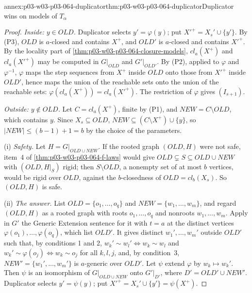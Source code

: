 \begin{annexitem}{annex:p03-w03-p03-064-duplicator}{thm:p03-w03-p03-064-duplicator}{Duplicator wins on models of \(T_\alpha\)}
\begin{proof}
\emph{Inside: \(y\in\mathit{OLD}\).}  Duplicator selects
\(y'=\varphi(y)\); put \(X'^+=X_s'\cup\{y'\}\).  By (P3), \(\mathit{OLD}\) is
\(a\)-closed and contains \(X^+\), and \(\mathit{OLD}'\) is \(a\)-closed and
contains \(X'^+\).  By the locality part of
\cref{thm:p03-w03-p03-064-closure-models}, \(cl_a(X^+)\) and
\(cl_a(X'^+)\) may be computed in \(G|_{\mathit{OLD}}\) and
\(G'|_{\mathit{OLD}'}\).  By (P2), applied to \(\varphi\) and
\(\varphi^{-1}\), \(\varphi\) maps the step sequences from \(X^+\) inside
\(\mathit{OLD}\) onto those from \(X'^+\) inside \(\mathit{OLD}'\), hence
maps the union of the reachable sets onto the union of the reachable sets:
\(\varphi(cl_a(X^+))=cl_a(X'^+)\).  The restriction of \(\varphi\) gives
\((I_{s+1})\).

\emph{Outside: \(y\notin\mathit{OLD}\).}  Let \(C=cl_a(X^+)\), finite by
(P1), and \(\mathit{NEW}=C\setminus\mathit{OLD}\), which contains \(y\).
Since \(X_s\subseteq\mathit{OLD}\),
\(\mathit{NEW}\subseteq(C\setminus X^+)\cup\{y\}\), so
\(|\mathit{NEW}|\leq(b-1)+1=b\) by the choice of the parameters.

(i) \emph{Safety.}  Let \(H=G|_{\mathit{OLD}\cup\mathit{NEW}}\).  If the
rooted graph \((\mathit{OLD},H)\) were not safe, item~4 of
\cref{thm:p03-w03-p03-064-f-laws} would give
\(\mathit{OLD}\subsetneq S\subseteq\mathit{OLD}\cup\mathit{NEW}\) with
\((\mathit{OLD},H|_S)\) rigid; then \(S\setminus\mathit{OLD}\), a nonempty set
of at most \(b\) vertices, would be rigid over \(\mathit{OLD}\), against the
\(b\)-closedness of \(\mathit{OLD}=cl_b(X_s)\).  So \((\mathit{OLD},H)\) is
safe.

(ii) \emph{The answer.}  List \(\mathit{OLD}=\{o_1,\ldots,o_q\}\) and
\(\mathit{NEW}=\{w_1,\ldots,w_m\}\), and regard \((\mathit{OLD},H)\) as a
rooted graph with roots \(o_1,\ldots,o_q\) and nonroots \(w_1,\ldots,w_m\).
Apply in \(G'\) the Generic Extension sentence for it with \(t=a\) at the
distinct vertices \(\varphi(o_1),\ldots,\varphi(o_q)\), which list
\(\mathit{OLD}'\).  It gives distinct \(w_1',\ldots,w_m'\) outside
\(\mathit{OLD}'\) such that, by conditions 1 and 2, \(w_k'\sim w_l'\iff
w_k\sim w_l\) and \(w_k'\sim\varphi(o_j)\iff w_k\sim o_j\) for all \(k,l,j\),
and, by condition~3, \(\mathit{NEW}'=\{w_1',\ldots,w_m'\}\) is \(a\)-generic
over \(\mathit{OLD}'\).  Let \(\psi\) extend \(\varphi\) by \(w_k\mapsto
w_k'\).  Then \(\psi\) is an isomorphism of \(G|_{\mathit{OLD}\cup
\mathit{NEW}}\) onto \(G'|_{D'}\), where \(D'=\mathit{OLD}'\cup\mathit{NEW}'\).
Duplicator selects \(y'=\psi(y)\); put \(X'^+=X_s'\cup\{y'\}=\psi(X^+)\).


\end{proof}
\end{annexitem}
